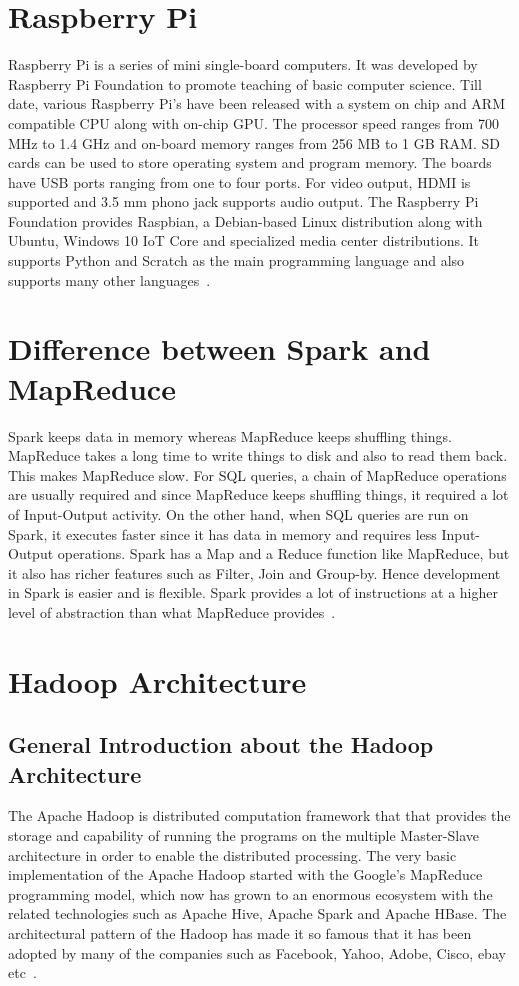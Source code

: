 \section{Raspberry Pi}
Raspberry Pi is a series of mini single-board computers. 
It was developed by Raspberry Pi Foundation to promote teaching of basic 
computer science. Till date, various Raspberry Pi's have been released with a 
system on chip and ARM compatible CPU along with on-chip GPU.   The processor 
speed ranges from 700 MHz to 1.4 GHz and on-board memory ranges from 256 MB to 
1 GB RAM. SD cards can be used to store operating system and program memory. The
boards have USB ports ranging from one to four ports. For video output, HDMI is 
supported and 3.5 mm phono jack supports audio output. The Raspberry Pi 
Foundation provides Raspbian, a Debian-based Linux distribution along with 
Ubuntu, Windows 10 IoT Core and specialized media center distributions. It 
supports Python and Scratch as the main programming language and also supports 
many other languages~\cite{hid-sp18-408-Raspberry-Pi}.

\section{Difference between Spark and MapReduce} 
Spark keeps data in memory whereas MapReduce keeps shuffling things. MapReduce 
takes a long time to write things to disk and also to read them back. This makes
MapReduce slow. For SQL queries, a chain of MapReduce operations are usually 
required and since MapReduce keeps shuffling things, it required a lot of 
Input-Output activity. On the other hand, when SQL queries are run on Spark, it 
executes faster since it has data in memory and requires less Input-Output 
operations. Spark has a Map and a Reduce function like MapReduce, but it also 
has richer features such as Filter, Join and Group-by. Hence development in 
Spark is easier and is flexible. Spark provides a lot of instructions at a 
higher level of abstraction than what MapReduce provides~\cite{hid-sp18-408-Difference}.

\section{Hadoop Architecture}
\subsection{General Introduction about the Hadoop Architecture}
The Apache Hadoop is distributed computation framework that that provides 
the storage and capability of running the programs on the multiple 
Master-Slave architecture in order to enable the distributed processing. 
The very basic implementation of the Apache Hadoop started with the 
Google’s MapReduce programming model, which now has grown to an 
enormous ecosystem with the related technologies such as Apache Hive, 
Apache Spark and Apache HBase. The architectural pattern of the Hadoop 
has made it so famous that it has been adopted by many of the companies 
such as Facebook, Yahoo, Adobe, 
Cisco, ebay etc~\cite{hid-sp18-412-hadoop-architecture-overview}.

